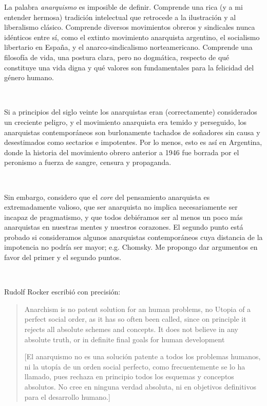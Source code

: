 \documentclass[a4paper, 12pt]{article}
\begin{document}
La palabra \textit{anarquismo} es imposible de definir. Comprende una rica (y a
mi entender hermosa) tradición intelectual que retrocede a la ilustración y al
liberalismo clásico. Comprende diversos movimientos obreros y sindicales nunca
idénticos entre sí, como el extinto movimiento anarquista argentino, el
socialismo libertario en España, y el anarco-sindicalismo norteamericano.
Comprende una filosofía de vida, una postura clara, pero no dogmática, respecto
de qué constituye una vida digna y qué valores son fundamentales para la
felicidad del género humano.

~ 

Si a principios del siglo veinte los anarquistas eran (correctamente) considerados
un creciente peligro, y el movimiento anarquista era temido y perseguido, los
anarquistas contemporáneos son burlonamente tachados de soñadores sin causa
y desestimados como sectarios e impotentes. Por lo menos, esto es así en
Argentina, donde la historia del movimiento obrero anterior a 1946 fue borrada
por el peronismo a fuerza de sangre, censura y propaganda.

~

Sin embargo, considero que el \textit{core} del pensamiento anarquista es
extremadamente valioso, que ser anarquista no implica necesariamente ser incapaz
de pragmatismo, y que todos debiéramos ser al menos un poco más anarquistas en
nuestras mentes y nuestros corazones. El segundo punto está probado si
consideramos algunos anarquistas contemporáneos cuya distancia de la impotencia
no podría ser mayor; e.g. Chomsky. Me propongo dar argumentos en favor del
primer y el segundo puntos.

~ 

Rudolf Rocker escribió con precisión:


\begin{quote}

Anarchism is no patent solution for an human problems,
no Utopia of a perfect social order, as it has so often been
called, since on principle it rejects all absolute schemes
and concepts. It does not believe in any absolute
truth, or in definite final goals for human development

[El anarquismo no es una solución patente a todos los problemas humanos, 
ni la utopía de un orden social perfecto, como frecuentemente se lo ha llamado, 
pues rechaza en principio todos los esquemas y conceptos absolutos. No cree en
ninguna verdad absoluta, ni en objetivos definitivos para el desarrollo humano.]

\end{quote}
\end{document}
